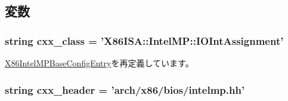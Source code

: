 \subsection{変数}
\hypertarget{classIntelMP_1_1X86IntelMPIOIntAssignment_a58cd55cd4023648e138237cfc0822ae3}{
\subsubsection[{cxx\_\-class}]{\setlength{\rightskip}{0pt plus 5cm}string {\bf cxx\_\-class} = '{\bf X86ISA::IntelMP::IOIntAssignment}'}}
\label{classIntelMP_1_1X86IntelMPIOIntAssignment_a58cd55cd4023648e138237cfc0822ae3}


\hyperlink{classIntelMP_1_1X86IntelMPBaseConfigEntry_a58cd55cd4023648e138237cfc0822ae3}{X86IntelMPBaseConfigEntry}を再定義しています。\hypertarget{classIntelMP_1_1X86IntelMPIOIntAssignment_a17da7064bc5c518791f0c891eff05fda}{
\subsubsection[{cxx\_\-header}]{\setlength{\rightskip}{0pt plus 5cm}string {\bf cxx\_\-header} = 'arch/x86/bios/intelmp.hh'}}
\label{classIntelMP_1_1X86IntelMPIOIntAssignment_a17da7064bc5c518791f0c891eff05fda}


